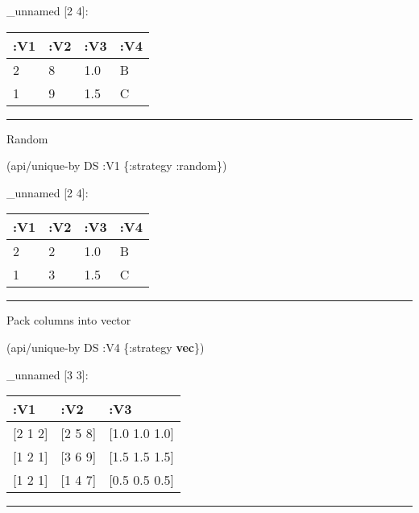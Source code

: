 \documentclass[]{article}
\newenvironment{Shaded}{\begin{snugshade}}{\end{snugshade}}
\newcommand{\AttributeTok}[1]{\textcolor[rgb]{0.77,0.63,0.00}{#1}}
\newcommand{\KeywordTok}[1]{\textcolor[rgb]{0.13,0.29,0.53}{\textbf{#1}}}
\newcommand{\NormalTok}[1]{#1}
\begin{document}
\_unnamed {[}2 4{]}:

\begin{longtable}[]{@{}llll@{}}
\toprule
:V1 & :V2 & :V3 & :V4\tabularnewline
\midrule
\endhead
2 & 8 & 1.0 & B\tabularnewline
1 & 9 & 1.5 & C\tabularnewline
\bottomrule
\end{longtable}

\begin{center}\rule{0.5\linewidth}{0.5pt}\end{center}

Random

\begin{Shaded}
\begin{Highlighting}[]
\NormalTok{(api/unique-by DS }\AttributeTok{:V1}\NormalTok{ \{}\AttributeTok{:strategy} \AttributeTok{:random}\NormalTok{\})}
\end{Highlighting}
\end{Shaded}

\_unnamed {[}2 4{]}:

\begin{longtable}[]{@{}llll@{}}
\toprule
:V1 & :V2 & :V3 & :V4\tabularnewline
\midrule
\endhead
2 & 2 & 1.0 & B\tabularnewline
1 & 3 & 1.5 & C\tabularnewline
\bottomrule
\end{longtable}

\begin{center}\rule{0.5\linewidth}{0.5pt}\end{center}

Pack columns into vector

\begin{Shaded}
\begin{Highlighting}[]
\NormalTok{(api/unique-by DS }\AttributeTok{:V4}\NormalTok{ \{}\AttributeTok{:strategy} \KeywordTok{vec}\NormalTok{\})}
\end{Highlighting}
\end{Shaded}

\_unnamed {[}3 3{]}:

\begin{longtable}[]{@{}lll@{}}
\toprule
:V1 & :V2 & :V3\tabularnewline
\midrule
\endhead
{[}2 1 2{]} & {[}2 5 8{]} & {[}1.0 1.0 1.0{]}\tabularnewline
{[}1 2 1{]} & {[}3 6 9{]} & {[}1.5 1.5 1.5{]}\tabularnewline
{[}1 2 1{]} & {[}1 4 7{]} & {[}0.5 0.5 0.5{]}\tabularnewline
\bottomrule
\end{longtable}

\begin{center}\rule{0.5\linewidth}{0.5pt}\end{center}
\end{document}
